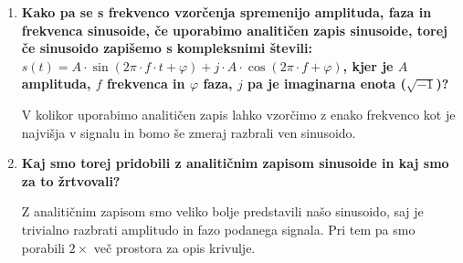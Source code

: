\documentclass[a4paper,11pt]{article}
\begin{document}
\begin{enumerate}
 	
	\item \textbf{Kako pa se s frekvenco vzorčenja spremenijo amplituda, faza in frekvenca sinusoide, če uporabimo analitičen zapis sinusoide, torej če sinusoido zapišemo s kompleksnimi števili: $s(t) = A\cdot \sin(2\pi \cdot f \cdot t + \varphi) + j \cdot A \cdot \cos(2 \pi \cdot f + \varphi)$, kjer je $A$ amplituda, $f$ frekvenca in $\varphi$ faza, $j$ pa je imaginarna enota ($\sqrt{-1}$)?}
	
V kolikor uporabimo analitičen zapis lahko vzorčimo z enako frekvenco kot je najvišja v signalu in bomo še zmeraj razbrali ven sinusoido.
	
	\item \textbf{Kaj smo torej pridobili z analitičnim zapisom sinusoide in kaj smo za to žrtvovali?}
	
	Z analitičnim zapisom smo veliko bolje predstavili našo sinusoido, saj je trivialno razbrati amplitudo in fazo podanega signala. Pri tem pa smo porabili $2\times$ več prostora za opis krivulje.

\end{enumerate}
\end{document}
